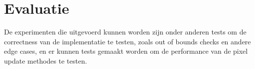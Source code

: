 \documentclass[11pt]{article}
\begin{document}
    \section{Evaluatie}\label{sec:evaluatie}
    De experimenten die uitgevoerd kunnen worden zijn onder anderen tests om de correctness van
    de implementatie te testen, zoals out of bounds checks en andere edge cases, en er kunnen
    tests gemaakt worden om de performance van de pixel update methodes te testen.
\end{document}
